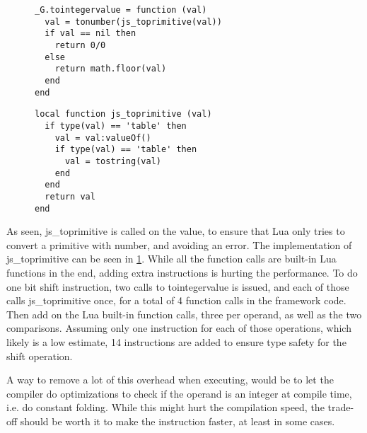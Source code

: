 \begin{figure}[h!]
\begin{minipage}{0.45\textwidth}
\begin{verbatim}
_G.tointegervalue = function (val)
  val = tonumber(js_toprimitive(val))
  if val == nil then
    return 0/0
  else
    return math.floor(val)
  end
end
\end{verbatim}
\label{lst:tessel-lua-tointegervalue}
\end{minipage}\hfill
\begin{minipage}{0.45\textwidth}
\begin{verbatim}
local function js_toprimitive (val)
  if type(val) == 'table' then
    val = val:valueOf()
    if type(val) == 'table' then
      val = tostring(val)
    end
  end
  return val
end
\end{verbatim}
\label{lst:tessel-lua-js-toprimitive}
\end{minipage}
\end{figure}


As seen, js\_toprimitive is called on the value, to ensure that Lua only tries to convert a primitive with number, and avoiding an error.
The implementation of js\_toprimitive can be seen in \cref{lst:tessel-lua-js-toprimitive}.
While all the function calls are built-in Lua functions in the end, adding extra instructions is hurting the performance.
To do one bit shift instruction, two calls to tointegervalue is issued, and each of those calls js\_toprimitive once, for a total of 4 function calls in the framework code.
Then add on the Lua built-in function calls, three per operand, as well as the two comparisons.
Assuming only one instruction for each of those operations, which likely is a low estimate, 14 instructions are added to ensure type safety for the shift operation.

A way to remove a lot of this overhead when executing, would be to let the compiler do optimizations to check if the operand is an integer at compile time, i.e. do constant folding.
While this might hurt the compilation speed, the trade-off should be worth it to make the instruction faster, at least in some cases.

